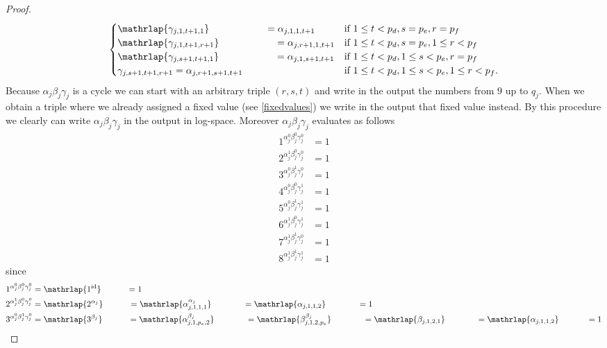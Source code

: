 \documentclass{article}
\begin{document}
\begin{proof}
\begin{align*}
\begin{cases}
\mathrlap{\gamma_{j,1,t+1,1}}\hphantom{\gamma_{j,s+1,t+1,r+1}} = \alpha_{j,1,1,t+1} & \text{if } 1 \leq t < p_d, s=p_e, r=p_f\\
\mathrlap{\gamma_{j,1,t+1,r+1}}\hphantom{\gamma_{j,s+1,t+1,r+1}} = \alpha_{j,r+1,1,t+1} & \text{if } 1 \leq t < p_d, s=p_e, 1 \leq r < p_f\\
\mathrlap{\gamma_{j,s+1,t+1,1}}\hphantom{\gamma_{j,s+1,t+1,r+1}} = \alpha_{j,1,s+1,t+1} & \text{if } 1 \leq t < p_d, 1 \leq s < p_e, r=p_f\\
\gamma_{j,s+1,t+1,r+1} = \alpha_{j,r+1,s+1,t+1} & \text{if } 1 \leq t < p_d, 1 \leq s < p_e, 1 \leq r < p_f.
\end{cases}
\end{align*}
Because $\alpha_j\beta_j\gamma_j$ is a cycle we can start with an arbitrary triple $(r,s,t)$ and write in the output the numbers from $9$ up to $q_j$. When we obtain a triple where we already assigned a fixed value (see \eqref{fixedvalues}) we write in the output that fixed value instead. By this procedure we clearly can write $\alpha_j\beta_j\gamma_j$ in the output in log-space. Moreover $\alpha_j\beta_j\gamma_j$ evaluates as follows
\begin{equation}\label{equationevaluationjalphabetagamma}
\begin{split}
1^{\alpha_j^0\beta_j^0\gamma_j^0}&= 1\\
2^{\alpha_j^1\beta_j^0\gamma_j^0}&= 1\\
3^{\alpha_j^0\beta_j^1\gamma_j^0}&= 1\\
4^{\alpha_j^0\beta_j^0\gamma_j^1}&= 1\\
5^{\alpha_j^0\beta_j^1\gamma_j^1}&= 1\\
6^{\alpha_j^1\beta_j^0\gamma_j^1}&= 1\\
7^{\alpha_j^1\beta_j^1\gamma_j^0}&= 1\\
8^{\alpha_j^1\beta_j^1\gamma_j^1}&= 1
\end{split}
\end{equation}
since
\begin{align*}
1^{\alpha_j^0\beta_j^0\gamma_j^0}&=\mathrlap{1^{\mathrm{id}}}\hphantom{8^{\alpha_j\beta_j\gamma_j}}= 1\\
2^{\alpha_j^1\beta_j^0\gamma_j^0}&=\mathrlap{2^{\alpha_j}}\hphantom{8^{\alpha_j\beta_j\gamma_j}} = \mathrlap{\alpha_{j,1,1,1}^{\alpha_j}}\hphantom{\alpha_{j,p_f,p_e,1}^{\alpha_j\beta_j\gamma_j}} = \mathrlap{\alpha_{j,1,1,2}}\hphantom{\alpha_{j,p_f,p_e,2}^{\beta_j\gamma_j}} = 1\\
3^{\alpha_j^0\beta_j^1\gamma_j^0}&=\mathrlap{3^{\beta_j}}\hphantom{8^{\alpha_j\beta_j\gamma_j}} = \mathrlap{\alpha_{j,1,p_e,2}^{\beta_j}}\hphantom{\alpha_{j,p_f,p_e,1}^{\alpha_j\beta_j\gamma_j}} = \mathrlap{\beta_{j,1,2,p_e}^{\beta_j}}\hphantom{\alpha_{j,p_f,p_e,2}^{\beta_j\gamma_j}} = \mathrlap{\beta_{j,1,2,1}}\hphantom{\beta_{j,p_f,2,p_e}^{\beta_j\gamma_j}} = \mathrlap{\alpha_{j,1,1,2}}\hphantom{\beta_{j,p_f,2,1}^{\gamma_j}} = 1\\

\end{align*}
\end{proof}
\end{document}

